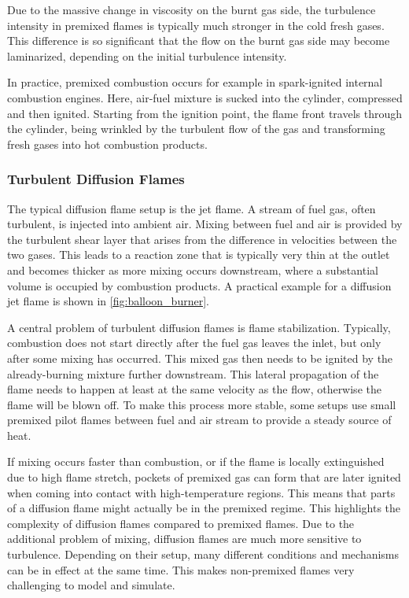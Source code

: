 %
Due to the massive change in viscosity on the burnt gas side, the turbulence
intensity in premixed flames is typically much stronger in the cold fresh gases.
%
This difference is so significant that the flow on the burnt gas side may become
laminarized, depending on the initial turbulence intensity.
%

%
In practice, premixed combustion occurs for example in spark-ignited internal
combustion engines.
%
Here, air-fuel mixture is sucked into the cylinder, compressed and then ignited.
%
Starting from the ignition point, the flame front travels through the cylinder,
being wrinkled by the turbulent flow of the gas and transforming fresh gases
into hot combustion products.
%
%
\subsubsection{Turbulent Diffusion Flames} %
\label{ssub:turbulent_diffusion_flames}
%
The typical diffusion flame setup is the jet flame.
%
A stream of fuel gas, often turbulent, is injected into ambient air.
%
Mixing between fuel and air is provided by the turbulent shear layer that arises
from the difference in velocities between the two gases.
%
This leads to a reaction zone that is typically very thin at the outlet and
becomes thicker as more mixing occurs downstream, where a substantial volume is
occupied by combustion products.
%
A practical example for a diffusion jet flame is shown in
\cref{fig:balloon_burner}.
%

%
A central problem of turbulent diffusion flames is flame stabilization.
%
Typically, combustion does not start directly after the fuel gas leaves the
inlet, but only after some mixing has occurred.
%
This mixed gas then needs to be ignited by the already-burning mixture further
downstream.
%
This lateral propagation of the flame needs to happen at least at the same
velocity as the flow, otherwise the flame will be blown off.
%
To make this process more stable, some setups use small premixed pilot
flames between fuel and air stream to provide a steady source of heat.
%

%
If mixing occurs faster than combustion, or if the flame is locally extinguished
due to high flame stretch, pockets of premixed gas can form that are later
ignited when coming into contact with high-temperature regions.
%
This means that parts of a diffusion flame might actually be in the premixed
regime.
%
This highlights the complexity of diffusion flames compared to premixed flames.
%
Due to the additional problem of mixing, diffusion flames are much more
sensitive to turbulence.
%
Depending on their setup, many different conditions and mechanisms can be in
effect at the same time.
%
This makes non-premixed flames very challenging to model and simulate.
%
%
%
